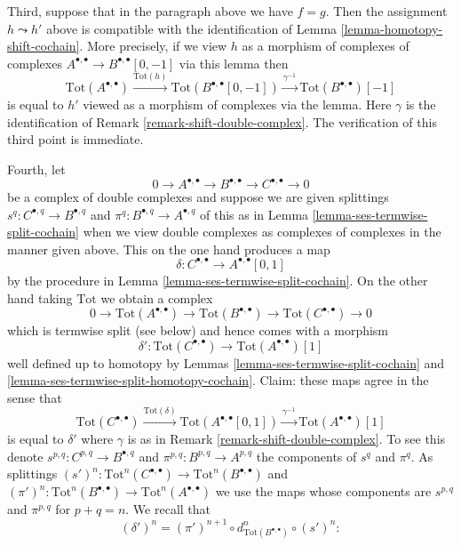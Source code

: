 \begin{remark}
\medskip\noindent
Third, suppose that in the paragraph above we have $f = g$.
Then the assignment $h \leadsto h'$ above is compatible with
the identification of Lemma \ref{lemma-homotopy-shift-cochain}.
More precisely, if we view $h$ as a morphism of complexes
of complexes $A^{\bullet, \bullet} \to B^{\bullet, \bullet}[0, -1]$
via this lemma then
$$
\text{Tot}(A^{\bullet, \bullet})
\xrightarrow{\text{Tot}(h)}
\text{Tot}(B^{\bullet, \bullet}[0, -1])
\xrightarrow{\gamma^{-1}}
\text{Tot}(B^{\bullet, \bullet})[-1]
$$
is equal to $h'$ viewed as a morphism of complexes via the lemma.
Here $\gamma$ is the identification of
Remark \ref{remark-shift-double-complex}.
The verification of this third point is immediate.

\medskip\noindent
Fourth, let
$$
0 \to A^{\bullet, \bullet} \to B^{\bullet, \bullet} \to
C^{\bullet, \bullet} \to 0
$$
be a complex of double complexes and suppose we are given splittings
$s^q : C^{\bullet, q} \to B^{\bullet, q}$ and
$\pi^q : B^{\bullet, q} \to A^{\bullet, q}$
of this as in Lemma \ref{lemma-ses-termwise-split-cochain}
when we view double complexes
as complexes of complexes in the manner given above.
This on the one hand produces a map
$$
\delta : C^{\bullet, \bullet} \longrightarrow A^{\bullet, \bullet}[0, 1]
$$
by the procedure in Lemma \ref{lemma-ses-termwise-split-cochain}.
On the other hand taking $\text{Tot}$ we obtain a complex
$$
0 \to \text{Tot}(A^{\bullet, \bullet}) \to
\text{Tot}(B^{\bullet, \bullet}) \to
\text{Tot}(C^{\bullet, \bullet}) \to 0
$$
which is termwise split (see below) and hence comes with a morphism
$$
\delta' :
\text{Tot}(C^{\bullet, \bullet})
\longrightarrow
\text{Tot}(A^{\bullet, \bullet})[1]
$$
well defined up to homotopy by Lemmas \ref{lemma-ses-termwise-split-cochain}
and \ref{lemma-ses-termwise-split-homotopy-cochain}. Claim:
these maps agree in the sense that
$$
\text{Tot}(C^{\bullet, \bullet})
\xrightarrow{\text{Tot}(\delta)}
\text{Tot}(A^{\bullet, \bullet}[0, 1]) \xrightarrow{\gamma^{-1}}
\text{Tot}(A^{\bullet, \bullet})[1]
$$
is equal to $\delta'$ where $\gamma$ is as in
Remark \ref{remark-shift-double-complex}. To see this denote
$s^{p, q} : C^{p, q} \to B^{\bullet, q}$ and
$\pi^{p, q} : B^{p, q} \to A^{p, q}$ the components of $s^q$ and $\pi^q$.
As splittings
$(s')^n : \text{Tot}^n(C^{\bullet, \bullet}) \to
\text{Tot}^n(B^{\bullet, \bullet})$
and
$(\pi')^n : \text{Tot}^n(B^{\bullet, \bullet}) \to
\text{Tot}^n(A^{\bullet, \bullet})$
we use the maps whose components are $s^{p, q}$ and $\pi^{p, q}$
for $p + q = n$. We recall that
$$
(\delta')^n =
(\pi')^{n + 1} \circ d_{\text{Tot}(B^{\bullet, \bullet})}^n \circ (s')^n :
$$
\end{remark}
